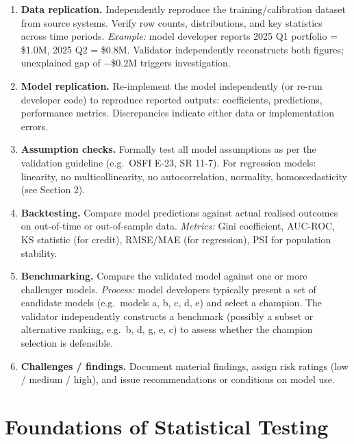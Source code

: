 \documentclass[11pt, a4paper]{article}
\begin{document}
\begin{enumerate}[label=\textbf{\arabic*.}]

\item \textbf{Data replication.}
Independently reproduce the training/calibration dataset from source systems.
Verify row counts, distributions, and key statistics across time periods.
\textit{Example:} model developer reports 2025 Q1 portfolio = \$1.0M, 2025 Q2 = \$0.8M.
Validator independently reconstructs both figures; unexplained gap of $-\$0.2$M triggers investigation.

\item \textbf{Model replication.}
Re-implement the model independently (or re-run developer code) to reproduce reported outputs: coefficients, predictions, performance metrics.
Discrepancies indicate either data or implementation errors.

\item \textbf{Assumption checks.}
Formally test all model assumptions as per the validation guideline (e.g.\ OSFI E-23, SR 11-7).
For regression models: linearity, no multicollinearity, no autocorrelation, normality, homoscedasticity (see Section 2).

\item \textbf{Backtesting.}
Compare model predictions against actual realised outcomes on out-of-time or out-of-sample data.
\textit{Metrics:} Gini coefficient, AUC-ROC, KS statistic (for credit), RMSE/MAE (for regression), PSI for population stability.

\item \textbf{Benchmarking.}
Compare the validated model against one or more challenger models.
\textit{Process:} model developers typically present a set of candidate models (e.g.\ models a, b, c, d, e) and select a champion.
The validator independently constructs a benchmark (possibly a subset or alternative ranking, e.g.\ b, d, g, e, c) to assess whether the champion selection is defensible.

\item \textbf{Challenges / findings.}
Document material findings, assign risk ratings (low / medium / high), and issue recommendations or conditions on model use.

\end{enumerate}

\section{Foundations of Statistical Testing}
\end{document}
